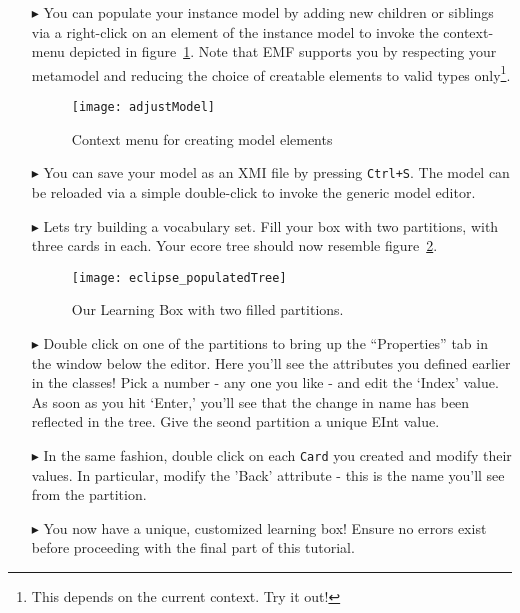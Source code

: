 \begin{itemize}
\item[$\blacktriangleright$] You can populate your instance model by adding new children or siblings via a right-click on an element of the instance model to invoke the context-menu depicted in figure~\ref{fig:create_instance}.
Note that EMF supports you by respecting your metamodel and reducing the choice of creatable elements to valid types only\footnote{This depends on the current context. Try it out!}.

\begin{figure}[htbp]
	\centering
  \texttt{[image: adjustModel]}
	\caption{Context menu for creating model elements}
	\label{fig:create_instance}
\end{figure}

\item[$\blacktriangleright$] You can save your model as an XMI file by pressing \texttt{Ctrl+S}.
The model can be reloaded via a simple double-click to invoke the generic model editor.

\item[$\blacktriangleright$] Lets try building a vocabulary set. Fill your box with two partitions, with three cards in each. Your ecore tree should now resemble figure~\ref{fig:eclipse_populatedTree}.

\begin{figure}[htbp]
	\centering
  \texttt{[image: eclipse\_populatedTree]}
	\caption{Our Learning Box with two filled partitions.}
	\label{fig:eclipse_populatedTree}
\end{figure}

\vfill
\pagebreak

\item[$\blacktriangleright$] Double click on one of the partitions to bring up the ``Properties'' tab in the window below the editor. Here you'll see the attributes you defined earlier in the classes! Pick a number - any one you like - and edit the `Index' value. As soon as you hit `Enter,' you'll see that the change in name has been reflected in the tree. Give the seond partition a unique EInt value.

\item[$\blacktriangleright$] In the same fashion, double click on each \texttt{Card} you created and modify their values. In particular, modify the 'Back' attribute - this is the name you'll see from the partition.

\item[$\blacktriangleright$] You now have a unique, customized learning box! Ensure no errors exist before proceeding with the final part of this tutorial.

\end{itemize}

